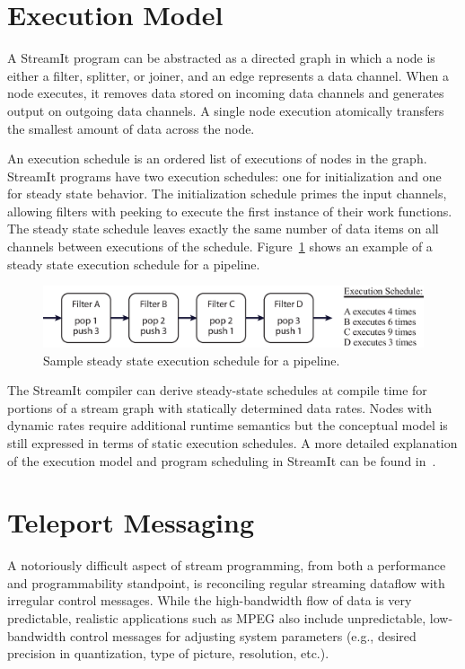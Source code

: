 \section{Execution Model}

A StreamIt program can be abstracted as a directed graph in which a node is
either a filter, splitter, or joiner, and an edge represents a data channel.
When a node executes, it removes data stored on incoming data channels and
generates output on outgoing data channels. A single node execution atomically 
transfers the smallest amount of data across the node. 

An execution schedule is an ordered list of 
executions of nodes in the graph. 
StreamIt programs have two execution schedules: one for initialization and 
one for steady state behavior. The initialization schedule primes the 
input channels, allowing filters with peeking to execute the first instance
of their work functions. The steady state schedule leaves exactly the 
same number of data items on all channels between 
executions of the schedule. Figure~\ref{fig:steady-state} shows an example
of a steady state execution schedule for a pipeline. 

\begin{figure}
  \begin{center}
    \includegraphics[scale=0.7, angle=0]{./scheduling_example.eps}
    \caption{Sample steady state execution schedule for a pipeline.}
    \label{fig:steady-state}
  \end{center}
\end{figure}

The StreamIt compiler can derive steady-state schedules at compile time
for portions of a stream graph with statically determined data rates. 
Nodes with dynamic rates require additional runtime semantics but the 
conceptual model is still expressed in terms of static execution schedules.
A more detailed explanation of the execution model and
program scheduling in StreamIt can be found 
in~\cite{karczmarek:sm-thesis:2002, streamit-lang-ref}.

\section{Teleport Messaging}
\label{sec:messaging}
A notoriously difficult aspect of stream programming, from both a
performance and programmability standpoint, is reconciling regular
streaming dataflow with irregular control messages.  While the
high-bandwidth flow of data is very predictable, realistic
applications such as MPEG also include unpredictable, low-bandwidth
control messages for adjusting system parameters (e.g., desired
precision in quantization, type of picture, resolution, etc.).

